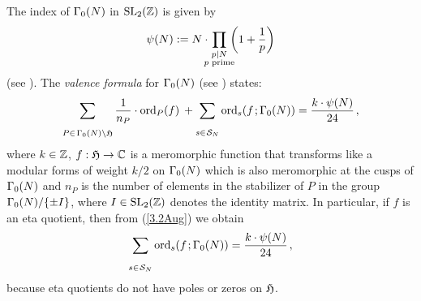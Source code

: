 \documentclass[a4paper,11pt]{amsart}
\begin{document}
The index of $\Gamma_0(N)$ in $\operatorname{SL}_2(\mathbb{Z})$ is given by
\begin{equation}
\psi(N):= %
N\cdot\hspace*{-.2cm}\prod_{\substack{p|N\\\text{$p$ prime}}}\hspace*{-.2cm}\left(1+\frac{1}{p}\right)
\label{27.04.2015.A}\end{equation}
(see \cite{ds}).
The \emph{valence formula} for $\Gamma_0(N)$ (see \cite{ra}) states:
\begin{equation}
\sum_{\substack{\ \\\ \\ P\in\hspace*{1pt}\Gamma_0(N)\backslash\mathfrak{H}}}\frac1{n_P}\cdot\operatorname{ord}_P(f)
\hspace{2pt}+\sum_{\substack{\ \\\ \\ s\in\hspace{.5pt}\mathcal{S}_N}}\operatorname{ord}_{s}(f\hspace{1pt};\Gamma_0(N)) 
=\frac{k\cdot\psi(N)}{24}\hspace{1.3pt},\label{3.2Aug}
\end{equation}
where $k\in\mathbb{Z}$, $f:\mathfrak{H}\rightarrow\mathbb{C}$ is a meromorphic function that transforms like a modular forms of weight
$k/2$ on $\Gamma_0(N)$ which is also meromorphic at the cusps of $\Gamma_0(N)$ and $n_P$ is the number of elements in the 
stabilizer of $P$ in the group $\Gamma_0(N)/\{\pm I\}$, where $I\in\operatorname{SL}_2(\mathbb{Z})$ denotes the identity matrix.
In particular, if $f$ is an eta quotient, then
from (\ref{3.2Aug}) we obtain
\begin{equation}
\sum_{\substack{\ \\\ \\ s\in\hspace{.5pt}\mathcal{S}_N}}\operatorname{ord}_{s}(f\hspace{1pt};\Gamma_0(N)) 
=\frac{k\cdot\psi(N)}{24}\hspace{1.3pt},
\label{27.04.2015.2}\end{equation}
because  eta quotients do not have poles or zeros on $\mathfrak{H}$. %
\end{document}
